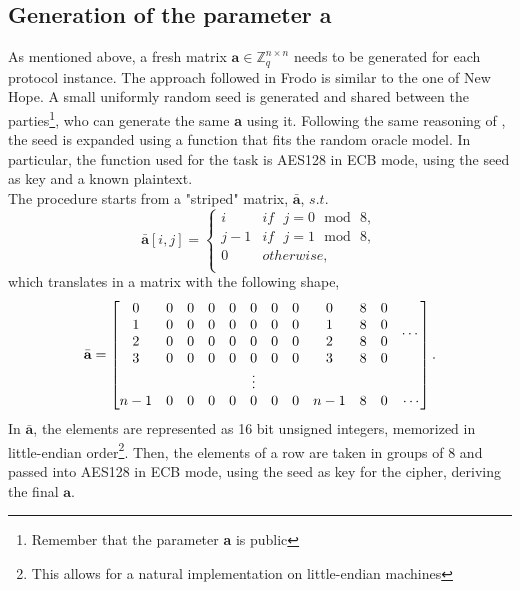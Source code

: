 \subsection{Generation of the parameter \textbf{a}}\label{sec:fr:a_generation}
As mentioned above, a fresh matrix $\textbf{a} \in \mathbb{Z}^{n\times n}_q$ needs to be generated for each protocol instance. The approach followed in Frodo is similar to the one of New Hope. A small uniformly random seed is generated and shared between the parties\footnote{Remember that the parameter \textbf{a} is public}, who can generate the same \textbf{a} using it. Following the same reasoning of \cite{newhope}, the seed is expanded using a function that fits the random oracle model. In particular, the function used for the task is AES128 in ECB mode, using the seed as key and a known plaintext.\\
The procedure starts from a "striped" matrix, $\bar{\textbf{a}}$, $s.t.$ 
\begin{equation*}
\bar{\textbf{a}}[i,j]=
\begin{cases}
i   & if\text{ }j=0\text{ }\mathrm{mod}\text{ }8,    \\
j-1 & if\text{ }j=1\text{ }\mathrm{mod}\text{ }8,    \\
0   & otherwise,                                     \\
\end{cases}
\end{equation*}
which translates in a matrix with the following shape,
\begin{equation*}
\bar{\textbf{a}}=
\setcounter{MaxMatrixCols}{12}
\begin{bmatrix}
0  & 0 & 0 & 0 & 0 & 0 & 0 & 0 & 0 & 8 & 0 & \multirow{4}{*}{$\cdots$}     \\
1  & 0 & 0 & 0 & 0 & 0 & 0 & 0 & 1 & 8 & 0 & \\
2  & 0 & 0 & 0 & 0 & 0 & 0 & 0 & 2 & 8 & 0 & \\
3  & 0 & 0 & 0 & 0 & 0 & 0 & 0 & 3 & 8 & 0 & \\
\multicolumn{11}{c}{\vdots}              & \\
n-1& 0 & 0 & 0 & 0 & 0 & 0 & 0 &n-1& 8 & 0 & \cdots \\
\end{bmatrix}.
\end{equation*}
In $\bar{\textbf{a}}$, the elements are represented as 16 bit unsigned integers, memorized in little-endian order\footnote{This allows for a natural implementation on little-endian machines}. Then, the elements of a row are taken in groups of 8 and passed into AES128 in ECB mode, using the seed as key for the cipher, deriving the final $\textbf{a}$.
